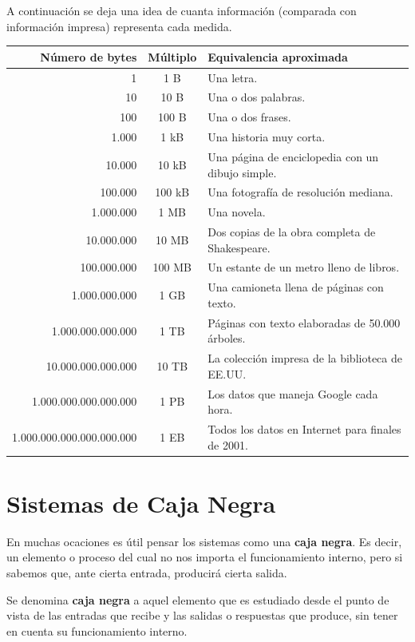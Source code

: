 A continuación se deja una idea de cuanta información (comparada con información
impresa) representa cada medida.

\small
\begin{tabular}{r c l}
    Número de bytes	& Múltiplo & Equivalencia aproximada\\
    \hline
                        1 &	1 B	    & Una letra.\\
                       10 & 10 B	& Una o dos palabras.\\
                      100 & 100 B	& Una o dos frases.\\
                    1.000 &	1 kB	& Una historia muy corta.\\
                   10.000 &	10 kB	& Una página de enciclopedia con un dibujo simple.\\
                  100.000 & 100 kB	& Una fotografía de resolución mediana.\\
                1.000.000 & 1 MB	& Una novela.\\
               10.000.000 & 10 MB	& Dos copias de la obra completa de Shakespeare.\\
              100.000.000 & 100 MB	& Un estante de un metro lleno de libros.\\
            1.000.000.000 & 1 GB	& Una camioneta llena de páginas con texto.\\
        1.000.000.000.000 & 1 TB	& Páginas con texto elaboradas de 50.000 árboles.\\
       10.000.000.000.000 & 10 TB	& La colección impresa de la biblioteca de EE.UU.\\
    1.000.000.000.000.000 & 1 PB	& Los datos que maneja Google cada hora.\\
1.000.000.000.000.000.000 & 1 EB	& Todos los datos en Internet para finales de 2001.\\
\end{tabular}
\normalsize

\section{Sistemas de Caja Negra}

En muchas ocaciones es útil pensar los sistemas como una \textbf{caja negra}.
Es decir, un elemento o proceso del cual no nos importa el funcionamiento interno,
pero si sabemos que, ante cierta entrada, producirá cierta salida.

\begin{definition}
    Se denomina \textbf{caja negra} a aquel elemento que es estudiado desde el
    punto de vista de las entradas que recibe y las salidas o respuestas que
    produce, sin tener en cuenta su funcionamiento interno.
\end{definition}

